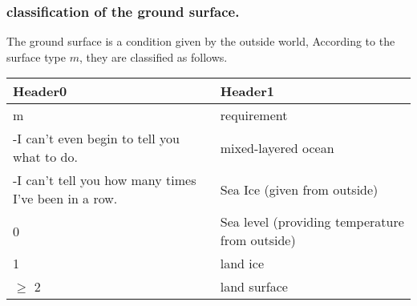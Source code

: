 \hypertarget{classification-of-the-ground-surface.}{%
\subsubsection{classification of the ground
surface.}\label{classification-of-the-ground-surface.}}

The ground surface is a condition given by the outside world, According
to the surface type \(m\), they are classified as follows.

\begin{longtable}[]{@{}ll@{}}
\toprule
\begin{minipage}[b]{0.47\columnwidth}\raggedright
Header0\strut
\end{minipage} & \begin{minipage}[b]{0.47\columnwidth}\raggedright
Header1\strut
\end{minipage}\tabularnewline
\midrule
\endhead
\begin{minipage}[t]{0.47\columnwidth}\raggedright
m\strut
\end{minipage} & \begin{minipage}[t]{0.47\columnwidth}\raggedright
requirement\strut
\end{minipage}\tabularnewline
\begin{minipage}[t]{0.47\columnwidth}\raggedright
-I can't even begin to tell you what to do.\strut
\end{minipage} & \begin{minipage}[t]{0.47\columnwidth}\raggedright
mixed-layered ocean\strut
\end{minipage}\tabularnewline
\begin{minipage}[t]{0.47\columnwidth}\raggedright
-I can't tell you how many times I've been in a row.\strut
\end{minipage} & \begin{minipage}[t]{0.47\columnwidth}\raggedright
Sea Ice (given from outside)\strut
\end{minipage}\tabularnewline
\begin{minipage}[t]{0.47\columnwidth}\raggedright
0\strut
\end{minipage} & \begin{minipage}[t]{0.47\columnwidth}\raggedright
Sea level (providing temperature from outside)\strut
\end{minipage}\tabularnewline
\begin{minipage}[t]{0.47\columnwidth}\raggedright
1\strut
\end{minipage} & \begin{minipage}[t]{0.47\columnwidth}\raggedright
land ice\strut
\end{minipage}\tabularnewline
\begin{minipage}[t]{0.47\columnwidth}\raggedright
\(\ge\) 2\strut
\end{minipage} & \begin{minipage}[t]{0.47\columnwidth}\raggedright
land surface\strut
\end{minipage}\tabularnewline
\bottomrule
\end{longtable}

